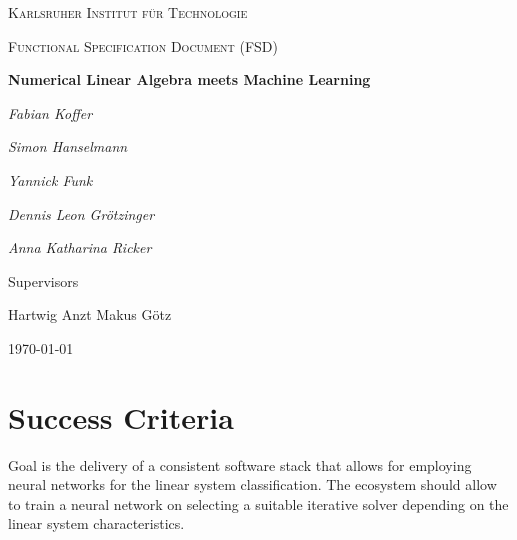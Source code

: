 \documentclass[parskip=full]{scrartcl}
\begin{document}
\begin{titlepage}
\centering
{\scshape\LARGE Karlsruher Institut für Technologie\par}
\vspace{1cm}
{\scshape\Large Functional Specification Document (FSD)\par}
\vspace{1.5cm}
{\huge\bfseries Numerical Linear Algebra meets Machine Learning \par}
\vspace {2cm}

{\Large\itshape Fabian Koffer\par}
{\Large\itshape Simon Hanselmann\par}
{\Large\itshape Yannick Funk\par}
{\Large\itshape Dennis Leon Gr\"{o}tzinger\par}
{\Large\itshape Anna Katharina Ricker\par}

\vfill
Supervisors\par
Hartwig Anzt
Makus G\"{o}tz

\vfill
{\large\today\par}
\end{titlepage}



\section{Success Criteria}

Goal is the delivery of a consistent software stack that allows for employing 
neural networks for the linear system classification. 
The ecosystem should allow to train a neural network on selecting a suitable iterative solver depending on the linear system characteristics.
\end{document}
